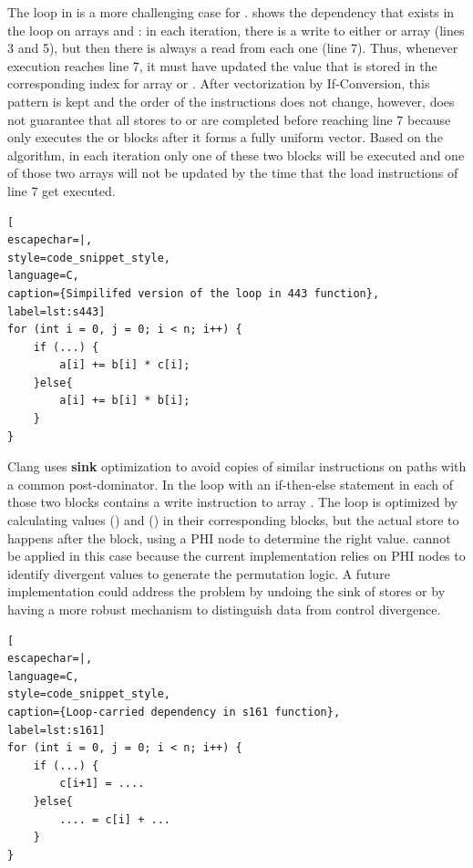 The loop in  is a more challenging case for \ALC.  shows the dependency that exists in the loop on arrays  and : in each iteration, there is a write to either  or  array (lines 3 and 5), but then there is always a read from each one (line 7). Thus, whenever execution reaches line 7, it must have updated the value that is stored in the corresponding index for array  or . After vectorization by If-Conversion, this pattern is kept and the order of the instructions does not change, however, \ALC does not guarantee that all stores to  or  are completed before reaching line 7 because \ALC only executes the  or  blocks after it forms a fully uniform vector. Based on the algorithm, in each iteration only one of these two blocks will be executed and one of those two arrays will not be updated by the time that the load instructions of line 7 get executed. 

\begin{center}
\begin{minipage}[t]{0.99\columnwidth}
\begin{lstlisting}[
escapechar=|,
style=code_snippet_style,
language=C,
caption={Simpilifed version of the loop in 443 function},
label=lst:s443]
for (int i = 0, j = 0; i < n; i++) {
    if (...) { 
        a[i] += b[i] * c[i];
    }else{
        a[i] += b[i] * b[i];
    }
}
\end{lstlisting} 
\end{minipage}
\end{center}

Clang uses \textbf{sink} optimization to avoid copies of similar instructions on paths with a common post-dominator. In the loop with an if-then-else statement in  each of those two blocks contains a write instruction to array . The loop is optimized by calculating values () and () in their corresponding blocks, but the actual store to  happens after the  block, using a PHI node to determine the right value. \ALC cannot be applied in this case because the current implementation relies on PHI nodes to identify divergent values to generate the permutation logic. A future implementation could address the problem by undoing the sink of stores or by having a more robust mechanism to distinguish data from control divergence.



\begin{center}
\begin{minipage}[t]{0.99\columnwidth}
\begin{lstlisting}[
escapechar=|,
language=C,
style=code_snippet_style,
caption={Loop-carried dependency in s161 function},
label=lst:s161]
for (int i = 0, j = 0; i < n; i++) {
    if (...) { 
        c[i+1] = ....
    }else{
        .... = c[i] + ...
    }
}
\end{lstlisting} 
\end{minipage}
\end{center}

